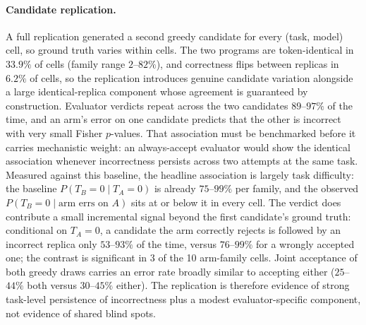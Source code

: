 \documentclass[a4paper,journal]{IAENGtran}
\begin{document}
\paragraph{Candidate replication.} A full replication generated a second greedy
candidate for every (task, model) cell, so ground truth varies within cells. The two
programs are token-identical in $33.9\%$ of cells (family range $2$--$82\%$), and
correctness flips between replicas in $6.2\%$ of cells, so the replication introduces
genuine candidate variation alongside a large identical-replica component whose
agreement is guaranteed by construction. Evaluator verdicts repeat across the two
candidates $89$--$97\%$ of the time, and an arm's error on one candidate predicts that
the other is incorrect with very small Fisher $p$-values. That association must be
benchmarked before it carries mechanistic weight: an always-accept evaluator would show
the identical association whenever incorrectness persists across two attempts at the
same task. Measured against this baseline, the headline association is largely task
difficulty: the baseline $P(T_B{=}0\mid T_A{=}0)$ is already $75$--$99\%$ per family,
and the observed $P(T_B{=}0\mid\text{arm errs on }A)$ sits at or below it in every
cell. The verdict does contribute a small incremental signal beyond the first
candidate's ground truth: conditional on $T_A{=}0$, a candidate the arm correctly
rejects is followed by an incorrect replica only $53$--$93\%$ of the time, versus
$76$--$99\%$ for a wrongly accepted one; the contrast is significant in 3 of the 10
arm-family cells. Joint acceptance of both greedy draws carries an
error rate broadly similar to accepting either ($25$--$44\%$ both versus $30$--$45\%$ either). The
replication is therefore evidence of strong task-level persistence of incorrectness
plus a modest evaluator-specific component, not evidence of shared blind spots.
\end{document}

